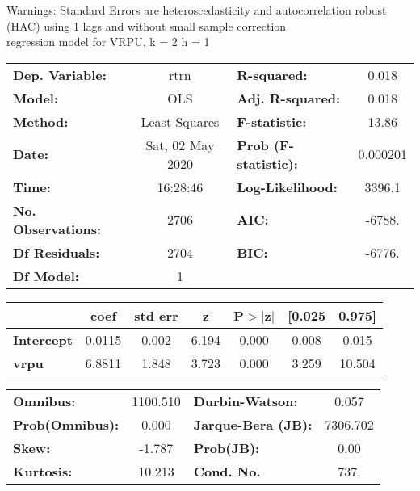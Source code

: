 Warnings: \newline
 [1] Standard Errors are heteroscedasticity and autocorrelation robust (HAC) using 1 lags and without small sample correction\\ 

regression model for VRPU, k = 2 h = 1\begin{center}
\begin{tabular}{lclc}
\toprule
\textbf{Dep. Variable:}    &       rtrn       & \textbf{  R-squared:         } &     0.018   \\
\textbf{Model:}            &       OLS        & \textbf{  Adj. R-squared:    } &     0.018   \\
\textbf{Method:}           &  Least Squares   & \textbf{  F-statistic:       } &     13.86   \\
\textbf{Date:}             & Sat, 02 May 2020 & \textbf{  Prob (F-statistic):} &  0.000201   \\
\textbf{Time:}             &     16:28:46     & \textbf{  Log-Likelihood:    } &    3396.1   \\
\textbf{No. Observations:} &        2706      & \textbf{  AIC:               } &    -6788.   \\
\textbf{Df Residuals:}     &        2704      & \textbf{  BIC:               } &    -6776.   \\
\textbf{Df Model:}         &           1      & \textbf{                     } &             \\
\bottomrule
\end{tabular}
\begin{tabular}{lcccccc}
                   & \textbf{coef} & \textbf{std err} & \textbf{z} & \textbf{P$> |$z$|$} & \textbf{[0.025} & \textbf{0.975]}  \\
\midrule
\textbf{Intercept} &       0.0115  &        0.002     &     6.194  &         0.000        &        0.008    &        0.015     \\
\textbf{vrpu}      &       6.8811  &        1.848     &     3.723  &         0.000        &        3.259    &       10.504     \\
\bottomrule
\end{tabular}
\begin{tabular}{lclc}
\textbf{Omnibus:}       & 1100.510 & \textbf{  Durbin-Watson:     } &    0.057  \\
\textbf{Prob(Omnibus):} &   0.000  & \textbf{  Jarque-Bera (JB):  } & 7306.702  \\
\textbf{Skew:}          &  -1.787  & \textbf{  Prob(JB):          } &     0.00  \\
\textbf{Kurtosis:}      &  10.213  & \textbf{  Cond. No.          } &     737.  \\
\bottomrule
\end{tabular}
\end{center}

